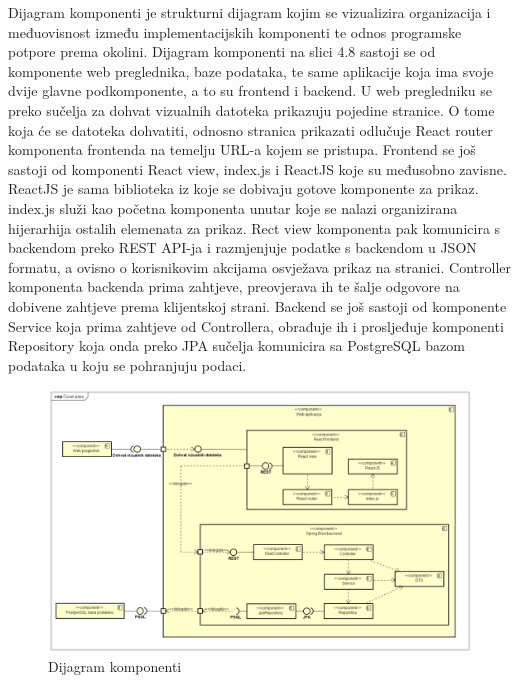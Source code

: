 			 Dijagram komponenti je strukturni dijagram kojim se vizualizira organizacija i međuovisnost između implementacijskih komponenti te odnos programske potpore prema okolini. Dijagram komponenti na slici 4.8 sastoji se od komponente web preglednika, baze podataka, te same aplikacije koja ima svoje dvije glavne podkomponente, a to su frontend i backend. U web pregledniku se preko sučelja za dohvat vizualnih datoteka prikazuju pojedine stranice. O tome koja će se datoteka dohvatiti, odnosno stranica prikazati odlučuje React router komponenta frontenda na temelju URL-a kojem se pristupa. Frontend se još sastoji od komponenti React view, index.js i ReactJS koje su međusobno zavisne. ReactJS je sama biblioteka iz koje se dobivaju gotove komponente za prikaz. index.js služi kao početna komponenta unutar koje se nalazi organizirana hijerarhija ostalih elemenata za prikaz. Rect view komponenta pak komunicira s backendom preko REST API-ja i razmjenjuje podatke s backendom u JSON formatu, a ovisno o korisnikovim akcijama osvježava prikaz na stranici. Controller komponenta backenda prima zahtjeve, preovjerava ih te šalje odgovore na dobivene zahtjeve prema klijentskoj strani. Backend se još sastoji od komponente Service koja prima zahtjeve od Controllera, obrađuje ih i prosljeđuje komponenti Repository koja onda preko JPA sučelja komunicira sa PostgreSQL bazom podataka u koju se pohranjuju podaci.
			 
			 \begin{figure}[H]
			 	\centering
			 	\includegraphics[width=15cm]{slike/Dijagram komponenti}
			 	\caption{Dijagram komponenti}
			 	\label{fig:Component-Diagram}
			 \end{figure}